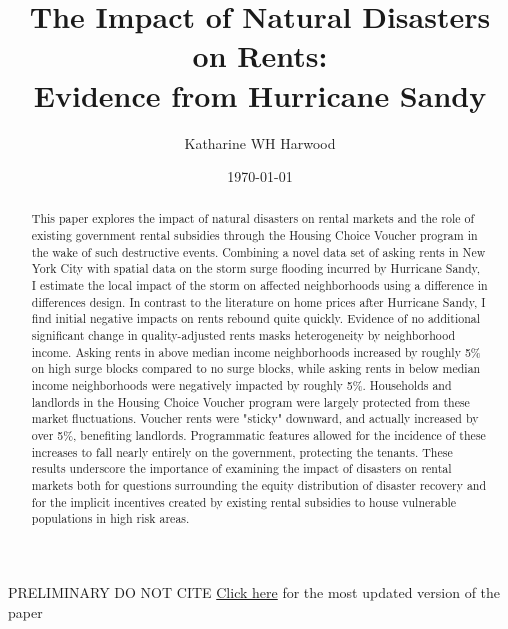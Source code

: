 \documentclass[12pt]{article}
\title{The Impact of Natural Disasters on Rents: \\ Evidence from Hurricane Sandy}
\author[]{Katharine WH Harwood}
\affil[]{New York University Wagner School of Public Service}
\date{\today{}}
\begin{document}
\maketitle
\begin{center}
PRELIMINARY DO NOT CITE
\href{}{Click here} for the most updated version of the paper
\end{center}
\begin{abstract}
    \small
    This paper explores the impact of natural disasters on rental markets and the role of existing government rental subsidies through the Housing Choice Voucher program in the wake of such destructive events. Combining a novel data set of asking rents in New York City with spatial data on the storm surge flooding incurred by Hurricane Sandy, I estimate the local impact of the storm on affected neighborhoods using a difference in differences design.  In contrast to the literature on home prices after Hurricane Sandy, I find initial negative impacts on rents rebound quite quickly. Evidence of no additional significant change in quality-adjusted rents masks heterogeneity by neighborhood income. Asking rents in above median income neighborhoods increased by roughly 5\% on high surge blocks compared to no surge blocks, while asking rents in below median income neighborhoods were negatively impacted by roughly 5\%. Households and landlords in the Housing Choice Voucher program were largely protected from these market fluctuations. Voucher rents were "sticky" downward, and actually increased by over 5\%, benefiting landlords. Programmatic features allowed for the incidence of these increases to fall nearly entirely on the government, protecting the tenants. These results underscore the importance of examining the impact of disasters on rental markets both for questions surrounding the equity distribution of disaster recovery and for the implicit incentives created by existing rental subsidies to house vulnerable populations in high risk areas. 
\end{abstract}

\vspace{3cm}
\small

\newpage
\end{document}
